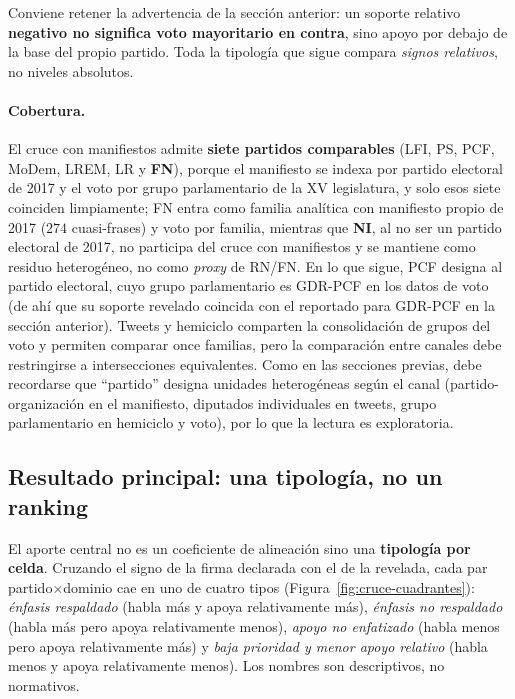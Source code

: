 Conviene retener la advertencia de la sección anterior: un soporte relativo
\textbf{negativo no significa voto mayoritario en contra}, sino apoyo por debajo
de la base del propio partido. Toda la tipología que sigue compara \emph{signos
relativos}, no niveles absolutos.

\paragraph{Cobertura.}
El cruce con manifiestos admite \textbf{siete partidos comparables} (LFI, PS,
PCF, MoDem, LREM, LR y \textbf{FN}), porque el manifiesto se indexa por partido
electoral de 2017 y el voto por grupo parlamentario de la XV legislatura, y solo
esos siete coinciden limpiamente; FN entra como familia analítica con manifiesto
propio de 2017 ($274$ cuasi-frases) y voto por familia, mientras que \textbf{NI},
al no ser un partido electoral de 2017, no participa del cruce con manifiestos y
se mantiene como residuo heterogéneo, no como \emph{proxy} de RN/FN. En lo que
sigue, PCF designa al partido electoral, cuyo grupo parlamentario es GDR-PCF en
los datos de voto (de ahí que su soporte revelado coincida con el reportado para
GDR-PCF en la sección anterior). Tweets y hemiciclo comparten la consolidación de
grupos del voto y permiten comparar once familias, pero la comparación entre
canales debe restringirse a intersecciones equivalentes. Como en las secciones
previas, debe recordarse que ``partido'' designa unidades heterogéneas según el
canal (partido-organización en el manifiesto, diputados individuales en tweets,
grupo parlamentario en hemiciclo y voto), por lo que la lectura es exploratoria.

\subsection{Resultado principal: una tipología, no un ranking}
\label{sec:res-cruce-tipologia}

El aporte central no es un coeficiente de alineación sino una \textbf{tipología
por celda}. Cruzando el signo de la firma declarada con el de la revelada, cada
par partido$\times$dominio cae en uno de cuatro tipos
(Figura~\ref{fig:cruce-cuadrantes}): \emph{énfasis respaldado} (habla más y apoya
relativamente más), \emph{énfasis no respaldado} (habla más pero apoya
relativamente menos), \emph{apoyo no enfatizado} (habla menos pero apoya
relativamente más) y \emph{baja prioridad y menor apoyo relativo} (habla menos y
apoya relativamente menos). Los nombres son descriptivos, no normativos.

